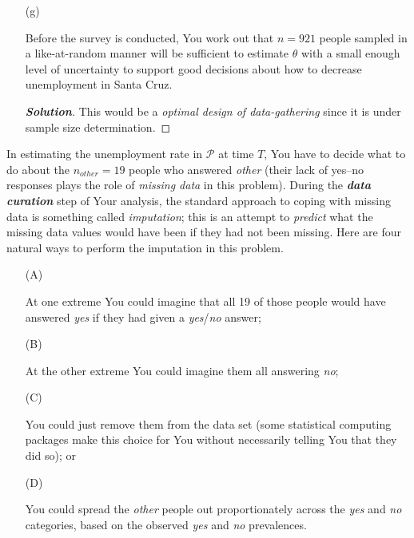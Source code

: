 \documentclass[12pt]{article}
\newenvironment{solution}{\begin{proof}[\textbf{\textit{Solution}}] }{\end{proof}}
\begin{document}
\begin{itemize}
\begin{itemize}
\item[(g)] 

Before the survey is conducted, You work out that $n = 921$ people sampled in a like-at-random manner will be sufficient to estimate $\theta$ with a small enough level of uncertainty to support good decisions about how to decrease unemployment in Santa Cruz.

\begin{tcolorbox}
    \begin{solution}
        This would be a \textit{optimal design of data-gathering} since it is under sample size determination. 
    \end{solution}
\end{tcolorbox}


\vspace*{0.6in}
 
\end{itemize}

\newpage
In estimating the unemployment rate in $\mathcal{ P }$ at time $T$, You have to decide what to do about the $n_{ other } = 19$ people who answered \textit{other} (their lack of yes--no responses plays the role of \textit{missing data} in this problem). During the \textbf{\textit{data curation}} step of Your analysis, the standard approach to coping with missing data is something called \textit{imputation}; this is an attempt to \textit{predict} what the missing data values would have been if they had not been missing. Here are four natural ways to perform the imputation in this problem.

\begin{itemize}

\item[(A)]

At one extreme You could imagine that all 19 of those people would have answered \textit{yes} if they had given a \textit{yes}/\textit{no} answer;

\item[(B)]

At the other extreme You could imagine them all answering \textit{no};

\item[(C)]

You could just remove them from the data set (some statistical computing packages make this choice for You without necessarily telling You that they did so); or

\item[(D)]

You could spread the \textit{other} people out proportionately across the \textit{yes} and \textit{no} categories, based on the observed \textit{yes} and \textit{no} prevalences.


\end{itemize}
\end{itemize}
\end{document}
